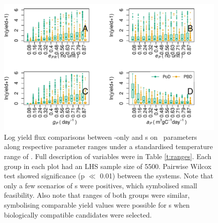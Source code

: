 \documentclass[../thesis.tex]{subfiles} %
\begin{document}
\begin{figure}[H]
    \centering
    \includegraphics[width=\linewidth]{result/bacEff1.pdf}
    \caption[Log yield flux comparisons between \phy-only and \pbs s on \phy\ parameters]{Log yield flux comparisons between \phy-only and \pbs s on \phy\ parameters along respective parameter ranges under a standardised temperature range of \temp.  Full description of variables were in Table \ref{t:ranges}.  Each group in each plot had an LHS sample size of 5500.  Pairwise Wilcox test showed significance (p $\ll$ 0.01) between the systems.  Note that only a few scenarios of \pbs s were positives, which symbolised small feasibility.  Also note that ranges of both groups were similar, symbolising comparable yield values were possible for \pbs s when biologically compatible candidates were selected.}
    \label{f:bacEffect}
\end{figure}

\end{document}

